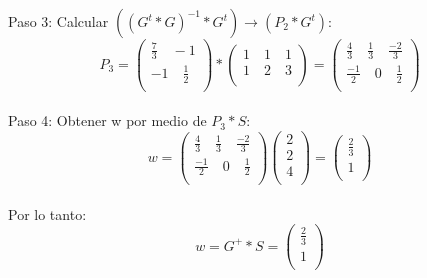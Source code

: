 \documentclass[
	11pt, %
]{beamer}
\begin{document}
\begin{frame}
  Paso 3: Calcular $((G^{t}*G)^{-1}*G^{t}) \rightarrow (P_{2}*G^{t})$:\\
  
  \[P_{3} = \begin{pmatrix}
    \frac{7}{3} \quad -1\\
    -1 \quad \frac{1}{2}\\
  \end{pmatrix} * \begin{pmatrix}
    1 \quad 1 \quad 1\\
    1 \quad 2 \quad 3\\
  \end{pmatrix} = \begin{pmatrix}
    \frac{4}{3} \quad \frac{1}{3} \quad \frac{-2}{3}\\
    \frac{-1}{2} \quad 0 \quad \frac{1}{2}\\
  \end{pmatrix}\]\\

  Paso 4: Obtener w por medio de $P_{3}*S:$ \\

  \[ w = \begin{pmatrix}
    \frac{4}{3} \quad \frac{1}{3} \quad \frac{-2}{3}\\
    \frac{-1}{2} \quad 0 \quad \frac{1}{2}\\
  \end{pmatrix} \begin{pmatrix}
    2\\
    2\\
    4\\
  \end{pmatrix} = \begin{pmatrix}
    \frac{2}{3}\\
    1\\
  \end{pmatrix}
  \]\\

  Por lo tanto:   \[w = G^{+} * S = \begin{pmatrix}
    \frac{2}{3}\\
    1\\
  \end{pmatrix}\]
\end{frame}
\end{document}
